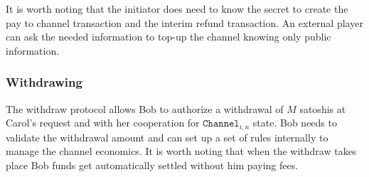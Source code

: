 \documentclass{llncs}
\begin{document}
It is worth noting that the initiator does need to know the secret to create the
pay to channel transaction and the interim refund transaction. An external
player can ask the needed information to top-up the channel knowing only public
information.

\subsubsection{Withdrawing} The withdraw protocol allows Bob to authorize a
withdrawal of $M$ satoshis at Carol's request and with her cooperation for
$\texttt{Channel}_{i,n}$ state. Bob needs to validate the withdrawal amount and
can set up a set of rules internally to manage the channel economics. It is
worth noting that when the withdraw takes place Bob funds get automatically
settled without him paying fees.
\end{document}
